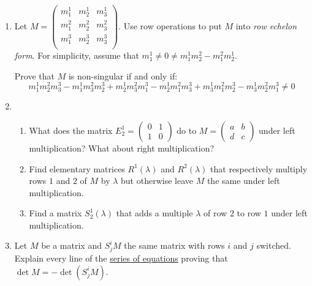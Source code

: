 



\begin{enumerate}
\item \label{det33} Let $M=\begin{pmatrix}
m^1_1 & m^1_2 & m^1_3\\
m^2_1 & m^2_2 & m^2_3\\
m^3_1 & m^3_2 & m^3_3\\
\end{pmatrix}$.  Use row operations to put $M$ into \emph{row echelon form}.  For simplicity, assume that $m_1^1\neq 0 \neq m^1_1m^2_2-m^2_1m^1_2$.

Prove that $M$ is non-singular if and only if:
\[
m^1_1m^2_2m^3_3 
- m^1_1m^2_3m^3_2 
+ m^1_2m^2_3m^3_1 
- m^1_2m^2_1m^3_3 
+ m^1_3m^2_1m^3_2
- m^1_3m^2_2m^3_1
\neq 0
\]


\item 
\begin{enumerate}
\item What does the matrix $E^1_2=\begin{pmatrix}
0 & 1 \\
1 & 0
\end{pmatrix}$ do to $M=\begin{pmatrix}
a & b \\
d & c
\end{pmatrix}$ under left multiplication?  What about right multiplication?
\item Find elementary matrices $R^1(\lambda)$ and $R^2(\lambda)$ that respectively multiply rows $1$ and $2$ of $M$ by $\lambda$ but otherwise leave $M$ the same under left multiplication.
\item Find a matrix $S^1_2(\lambda)$ that adds a multiple $\lambda$ of row $2$ to row $1$ under left multiplication.
\end{enumerate}


\item Let $M$ be a matrix and $S^i_jM$ the same matrix with rows \(i\) and \(j\) switched.  Explain every line of the 
\hyperlink{rowswap}{series of equations} proving that $\det M = -\det (S^i_jM)$.



\end{enumerate}
